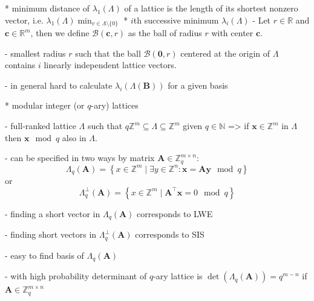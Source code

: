 \documentclass[
  a4paper,  %
  twoside,  %
  bibliography=totoc,
  headsepline,
  cleardoublepage=empty,
  parskip=half,
  draft=false
]{scrbook}
\begin{document}
* minimum distance of $\lambda_1(\Lambda)$ of a lattice is the length of its shortest nonzero vector, i.e. $\lambda_1(\Lambda) \min_{v \in \Lambda \setminus \{0\}}$
* $i$th successive minimum $\lambda_i(\Lambda)$
- Let $r\in \mathbb{R}$ and $\mathbf{c} \in \mathbb{R}^m$, then we define $\mathcal{B}(\mathbf{c}, r)$ as the ball of radius $r$ with center $\mathbf{c}$.

- smallest radius $r$ such that the ball $\mathcal{B}(\mathbf{0}, r)$ centered at the origin of $\Lambda$ contains $i$ linearly independent lattice vectors.

- in general hard to calculate $\lambda_i(\Lambda(\mathbf{B}))$ for a given basis

* modular integer (or $q$-ary) lattices %

- full-ranked lattice $\Lambda$ such that $q\mathbb{Z}^m \subseteq	\Lambda \subseteq	\mathbb{Z}^m$ given $q \in \mathbb{N}$ => if $\mathbf{x} \in \mathbb{Z}^m$ in $\Lambda$ then $\mathbf{x} \mod q$ also in $\Lambda$.

- can be specified in two ways by matrix $\mathbf{A} \in \mathbb{Z}_q^{m\times n}$: %
\begin{equation}
  \Lambda_q(\mathbf{A}) = \left\{ x \in \mathbb{Z}^m \mid \exists y \in \mathbb{Z}^n : \mathbf{x} = \mathbf{A}\mathbf{y} \mod q \right\}
\end{equation}
or
\begin{equation}
  \Lambda_q^\perp(\mathbf{A}) = \left\{ x \in \mathbb{Z}^m \mid  \mathbf{A}^\intercal\mathbf{x} = 0 \mod q \right\}
\end{equation}

- finding a short vector in $\Lambda_q(\mathbf{A})$ corresponds to LWE %

- finding short vectors in $\Lambda_q^\perp(\mathbf{A})$ corresponds to SIS %

- easy to find basis of $\Lambda_q(\mathbf{A})$ \cite{AFG13}

- with high probability determinant of $q$-ary lattice is $\det(\Lambda_q(\mathbf{A}))=q^{m-n}$ if $\mathbf{A} \in \mathbb{Z}_q^{m\times n}$
\end{document}
